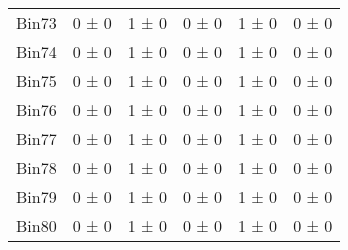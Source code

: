 \begin{tabular}{@{\extracolsep{4pt}}lccccc@{}}
     Bin73 & 0 ± 0 & 1 ± 0 & 0 ± 0 & 1 ± 0 & 0 ± 0 \\ 
     Bin74 & 0 ± 0 & 1 ± 0 & 0 ± 0 & 1 ± 0 & 0 ± 0 \\ 
     Bin75 & 0 ± 0 & 1 ± 0 & 0 ± 0 & 1 ± 0 & 0 ± 0 \\ 
     Bin76 & 0 ± 0 & 1 ± 0 & 0 ± 0 & 1 ± 0 & 0 ± 0 \\ 
     Bin77 & 0 ± 0 & 1 ± 0 & 0 ± 0 & 1 ± 0 & 0 ± 0 \\ 
     Bin78 & 0 ± 0 & 1 ± 0 & 0 ± 0 & 1 ± 0 & 0 ± 0 \\ 
     Bin79 & 0 ± 0 & 1 ± 0 & 0 ± 0 & 1 ± 0 & 0 ± 0 \\ 
     Bin80 & 0 ± 0 & 1 ± 0 & 0 ± 0 & 1 ± 0 & 0 ± 0 \\ 
\hline\hline
  \end{tabular}
